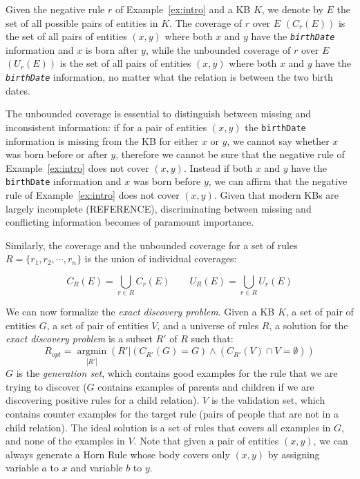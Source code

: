 \begin{myExample}
	Given the negative rule $r$ of Example~\ref{ex:intro} and a KB $K$, we denote by $E$ the set of all possible pairs of entities in $K$. The coverage of $r$ over $E$ $(C_r(E))$ is the set of all pairs of entities $(x,y)$ where both $x$ and $y$ have the \emph{\texttt{birthDate}} information and $x$ is born after $y$, while the unbounded coverage of $r$ over $E$ $(U_r(E))$ is the set of all pairs of entities $(x,y)$ where both $x$ and $y$ have the \emph{\texttt{birthDate}} information, no matter what the relation is between the two birth dates. 
\end{myExample}

The unbounded coverage is essential to distinguish between missing and inconsistent information: if for a pair of entities $(x,y)$ the \texttt{birthDate} information is missing from the KB for either $x$ or $y$, we cannot say whether $x$ was born before or after $y$, therefore we cannot be sure that the negative rule of Example~\ref{ex:intro} does not cover $(x,y)$. Instead if both $x$ and $y$ have the \texttt{birthDate} information and $x$ was born before $y$, we can affirm that the negative rule of Example~\ref{ex:intro} does not cover $(x,y)$. Given that modern KBs are largely incomplete (REFERENCE), discriminating between missing and conflicting information becomes of paramount importance.

Similarly, the coverage and the unbounded coverage for a set of rules $R=\{r_1,r_2,\cdots,r_n\}$ is the union of individual coverages:

$$C_R(E) = \bigcup \limits_{r \in R} C_r(E) \qquad U_R(E) = \bigcup \limits_{r \in R} U_r(E) $$

We can now formalize the \emph{exact discovery problem}.
Given a KB $K$, a set of pair of entities $G$, a set of pair of entities $V$, and a universe of rules $R$, 
a solution for the \emph{exact discovery problem} is a subset $R'$ of $R$  such that:
$$R_{opt}=\underset{|R'|}{\operatorname{argmin}}(R'|(C_{R'}(G) = G) \wedge (C_{R'}(V) \cap V = \emptyset) )$$
$G$ is the \emph{generation set}, which contains good examples for the rule that we are trying to discover ($G$ contains examples of parents and children if we are discovering positive rules for a child relation). $V$ is the validation set, which contains counter examples for the target rule (pairs of people that are not in a child relation). The ideal solution is a set of rules that covers all examples in $G$, and none of the examples in $V$. Note that given a pair of entities $(x,y)$, we can always generate a Horn Rule whose body covers only $(x,y)$ by assigning variable $a$ to $x$ and variable $b$ to $y$.

